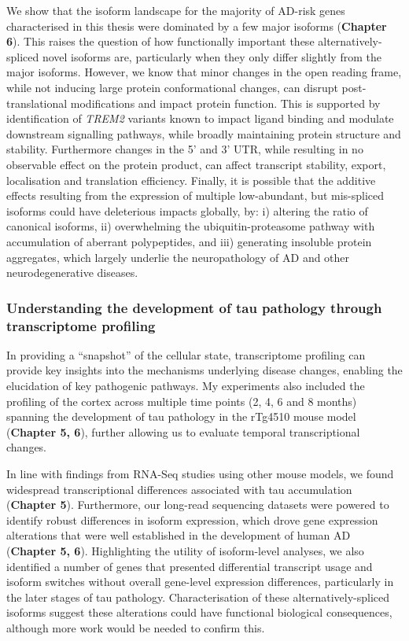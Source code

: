 We show that the isoform landscape for the majority of AD-risk genes characterised in this thesis were dominated by a few major isoforms (\textbf{Chapter 6}). This raises the question of how functionally important these alternatively-spliced novel isoforms are, particularly when they only differ slightly from the major isoforms. However, we know that minor changes in the open reading frame, while not inducing large protein conformational changes, can disrupt post-translational modifications and impact protein function\cite{Reixachs-Sole2022}. This is supported by identification of \textit{TREM2} variants known to impact ligand binding and modulate downstream signalling pathways, while broadly maintaining protein structure and stability\cite{Kober2016}. Furthermore changes in the 5' and 3' UTR, while resulting in no observable effect on the protein product, can affect transcript stability, export, localisation and translation efficiency\cite{Reixachs-Sole2022}. Finally, it is possible that the additive effects resulting from the expression of multiple low-abundant, but mis-spliced isoforms could have deleterious impacts globally, by: i) altering the ratio of canonical isoforms, ii) overwhelming the ubiquitin-proteasome pathway with accumulation of aberrant polypeptides, and iii) generating insoluble protein aggregates, which largely underlie the neuropathology of AD and other neurodegenerative diseases\cite{Davis2018}.

\subsubsection{Understanding the development of tau pathology through transcriptome profiling}
\label{ch7: results_pathology}
In providing a “snapshot” of the cellular state, transcriptome profiling can provide key insights into the mechanisms underlying disease changes, enabling the elucidation of key pathogenic pathways. My experiments also included the profiling of the cortex across multiple time points (2, 4, 6 and 8 months) spanning the development of tau pathology in the rTg4510 mouse model (\textbf{Chapter 5, 6}), further allowing us to evaluate temporal transcriptional changes. 

In line with findings from RNA-Seq studies using other mouse models, we found widespread transcriptional differences associated with tau accumulation (\textbf{Chapter 5}). Furthermore, our long-read sequencing datasets were powered to identify robust differences in isoform expression, which drove gene expression alterations that were well established in the development of human AD (\textbf{Chapter 5, 6}). Highlighting the utility of isoform-level analyses, we also identified a number of genes that presented differential transcript usage and isoform switches without overall gene-level expression differences, particularly in the later stages of tau pathology. Characterisation of these alternatively-spliced isoforms suggest these alterations could have functional biological consequences, although more work would be needed to confirm this. 

